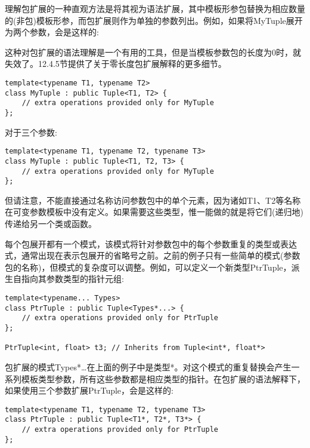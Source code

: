 理解包扩展的一种直观方法是将其视为语法扩展，其中模板形参包替换为相应数量的(非包)模板形参，而包扩展则作为单独的参数列出。例如，如果将MyTuple展开为两个参数，会是这样的:

\begin{tcolorbox}[colback=webgreen!5!white,colframe=webgreen!75!black]
\hspace*{0.75cm}这种对包扩展的语法理解是一个有用的工具，但是当模板参数包的长度为0时，就失效了。12.4.5节提供了关于零长度包扩展解释的更多细节。
\end{tcolorbox}

\begin{lstlisting}[style=styleCXX]
template<typename T1, typename T2>
class MyTuple : public Tuple<T1, T2> {
	// extra operations provided only for MyTuple
};
\end{lstlisting}

对于三个参数:

\begin{lstlisting}[style=styleCXX]
template<typename T1, typename T2, typename T3>
class MyTuple : public Tuple<T1, T2, T3> {
	// extra operations provided only for MyTuple
};
\end{lstlisting}

但请注意，不能直接通过名称访问参数包中的单个元素，因为诸如T1、T2等名称在可变参数模板中没有定义。如果需要这些类型，惟一能做的就是将它们(递归地)传递给另一个类或函数。

每个包展开都有一个模式，该模式将针对参数包中的每个参数重复的类型或表达式，通常出现在表示包展开的省略号之前。之前的例子只有一些简单的模式(参数包的名称)，但模式的复杂度可以调整。例如，可以定义一个新类型PtrTuple，派生自指向其参数类型的指针元组:

\begin{lstlisting}[style=styleCXX]
template<typename... Types>
class PtrTuple : public Tuple<Types*...> {
	// extra operations provided only for PtrTuple
};

PtrTuple<int, float> t3; // Inherits from Tuple<int*, float*>
\end{lstlisting}

包扩展的模式Types*…在上面的例子中是类型*。对这个模式的重复替换会产生一系列模板类型参数，所有这些参数都是相应类型的指针。在包扩展的语法解释下，如果使用三个参数扩展PtrTuple，会是这样的:

\begin{lstlisting}[style=styleCXX]
template<typename T1, typename T2, typename T3>
class PtrTuple : public Tuple<T1*, T2*, T3*> {
	// extra operations provided only for PtrTuple
};
\end{lstlisting}

